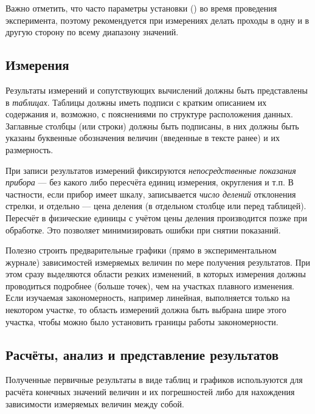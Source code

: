 Важно отметить, что часто параметры установки  ()
во время проведения эксперимента, поэтому рекомендуется при измерениях
делать проходы в одну и в другую сторону по всему диапазону значений.

\subsection{Измерения}

Результаты измерений и сопутствующих вычислений должны быть представлены
в \emph{таблицах}.
Таблицы должны иметь подписи с кратким описанием
их содержания и, возможно, с пояснениями по структуре расположения
данных. Заглавные столбцы (или строки) должны быть подписаны, в них
должны быть указаны буквенные обозначения величин (введенные в тексте
ранее) и их размерность.

При записи результатов измерений фиксируются \emph{непосредственные
показания прибора} --- без какого либо пересчёта единиц измерения,
округления и т.п. В частности, если прибор имеет шкалу, записывается
\emph{число делений} отклонения стрелки, и отдельно --- цена деления
(в отдельном столбце или перед таблицей).
Пересчёт в физические единицы с учётом цены деления производится позже
при обработке. Это позволяет минимизировать ошибки при снятии показаний.

Полезно строить предварительные графики (прямо в экспериментальном журнале)
зависимостей измеряемых величин по мере получения результатов.
При этом сразу выделяются области резких изменений,
в которых измерения должны проводиться подробнее (больше точек),
чем на участках плавного изменения. Если изучаемая закономерность,
например линейная, выполняется только на некотором участке,
то область измерений должна быть выбрана шире этого участка, чтобы можно было
установить границы работы закономерности.


\subsection{Расчёты, анализ и представление результатов}

Полученные первичные результаты в виде таблиц и графиков используются
для расчёта конечных значений величин и их погрешностей либо для нахождения
зависимости измеряемых величин между собой. 

